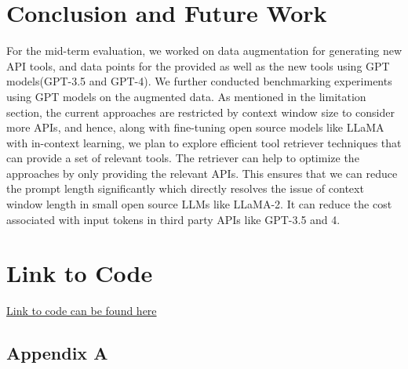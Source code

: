 \documentclass[10pt,twocolumn,letterpaper]{article}
\begin{document}
\section{Conclusion and Future Work}
For the mid-term evaluation, we worked on data augmentation for generating new API tools, and data points for the provided as well as the new tools using GPT models(GPT-3.5 and GPT-4). We further conducted benchmarking experiments using GPT models on the augmented data. As mentioned in the limitation section, the current approaches are restricted by context window size to consider more APIs, and hence, along with fine-tuning open source models like LLaMA with in-context learning, we plan to explore efficient tool retriever techniques that can provide a set of relevant tools. The retriever can help to optimize the approaches by only providing the relevant APIs. This ensures that we can reduce the prompt length significantly which directly resolves the issue of context window length in small open source LLMs like LLaMA-2. It can reduce the cost associated with input tokens in third party APIs like GPT-3.5 and 4.

\section{Link to Code}
\href{https://drive.google.com/file/d/1xMf-2o6aN9Hsxc5n1HZPORCdHv0xWO1Z/view?usp=sharing}{Link to code can be found here}

{\small
\nocite{*}


}

\appendix


\subsection{Appendix A}
\end{document}
